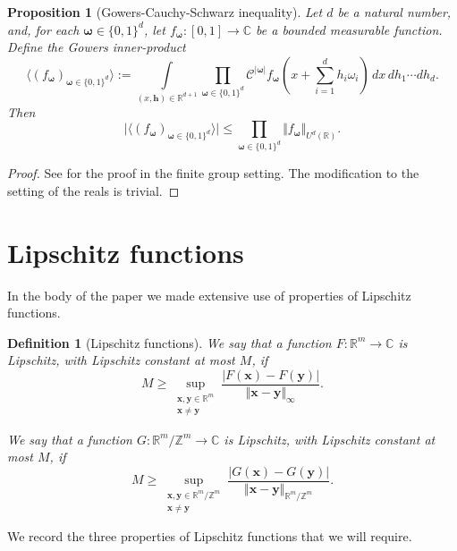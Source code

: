 \documentclass[12pt,a4paper,twoside,reqno]{amsart}
\newtheorem{Proposition}[Theorem]{Proposition}
\newtheorem{Definition}[Theorem]{Definition}
\newcommand{\bo}{\boldsymbol{\omega}}
\numberwithin{equation}{section}
\begin{document}
\begin{Proposition}[Gowers-Cauchy-Schwarz inequality]
\label{Proposition Gowers Cauchy Schwarz}
Let $d$ be a natural number, and, for each $\bo \in \{0,1\}^d$, let $f_{\bo}:[0,1]\longrightarrow \mathbb{C}$ be a bounded measurable function. Define the Gowers inner-product \[\langle (f_{\bo})_{\bo\in \{0,1\}^d}\rangle :=  \int\limits_{(x,\mathbf{h}) \in\mathbb{R}^{d+1}} \prod\limits_{\bo \in \{0,1\}^d}\mathcal{C}^{\vert \boldsymbol{\omega} \vert} f_{\bo}(x+\sum\limits_{i=1}^d h_i\omega_i) \, dx\,dh_1\cdots dh_d.\] Then \[\vert\langle (f_{\bo})_{\bo\in \{0,1\}^d}\rangle \vert \leqslant \prod\limits_{\bo\in \{0,1\}^d} \Vert f_{\bo}\Vert_{U^d(\mathbb{R})}.\]
\end{Proposition}
\begin{proof}
See \cite[Chapter 11]{TaVu06} for the proof in the finite group setting. The modification to the setting of the reals is trivial. 
\end{proof}

\section{Lipschitz functions}
\label{Lipschitz functions}

In the body of the paper we made extensive use of properties of Lipschitz functions. 

\begin{Definition}[Lipschitz functions]
We say that a function $F:\mathbb{R}^m \longrightarrow \mathbb{C}$ is Lipschitz, with Lipschitz constant at most $M$, if \[M \geqslant \sup\limits_{\substack{\mathbf{x},\mathbf{y}\in \mathbb{R}^m \\ \mathbf{x}\neq \mathbf{y}}} \frac{ \vert F(\mathbf{x}) - F(\mathbf{y}) \vert}{\Vert \mathbf{x} - \mathbf{y} \Vert_\infty }.\]

We say that a function $G:\mathbb{R}^m/\mathbb{Z}^m \longrightarrow \mathbb{C}$ is Lipschitz, with Lipschitz constant at most $M$, if \[ M \geqslant \sup\limits_{\substack{\mathbf{x},\mathbf{y}\in \mathbb{R}^m/\mathbb{Z}^m \\ \mathbf{x}\neq \mathbf{y}}} \frac{ \vert G(\mathbf{x}) - G(\mathbf{y}) \vert}{\Vert \mathbf{x} - \mathbf{y} \Vert_{\mathbb{R}^m/\mathbb{Z}^m}}.\]
\end{Definition}

We record the three properties of Lipschitz functions that we will require.
\end{document}
